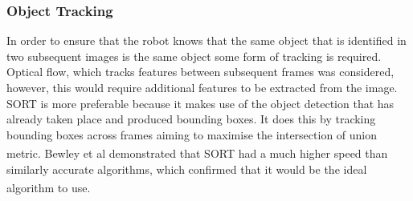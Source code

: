 \documentclass[11pt]{article}		%
\newcommand{\supercite}[1]{\textsuperscript{\cite{#1}}}		%
\newcommand{\figref}[1]{\hyperref[#1]{Figure \ref*{#1}}}    %
\begin{document}
	       
	        \subsubsection{Object Tracking}

	        In order to ensure that the robot knows that the same object that is identified in two subsequent images is the same object some form of tracking is required. Optical flow, which tracks features between subsequent frames was considered, however, this would require additional features to be extracted from the image. SORT is more preferable because it makes use of the object detection that has already taken place and produced bounding boxes. It does this by tracking bounding boxes across frames aiming to maximise the intersection of union metric. Bewley et al\supercite{object_tracking} demonstrated that SORT had a much higher speed than similarly accurate algorithms, which confirmed that it would be the ideal algorithm to use\supercite{object_tracking}.
	        
\end{document}
